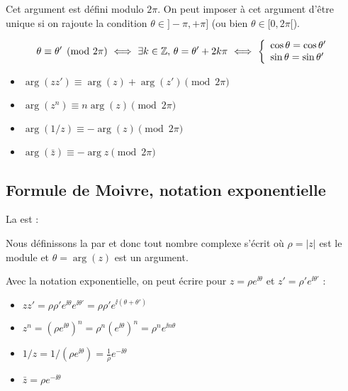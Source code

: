 \documentclass[10pt,class=article,crop=false]{standalone}
\begin{document}
\begin{multicols}{2}

Cet argument est défini modulo $2\pi$. On peut imposer à cet argument d'être unique si on
rajoute la condition $\theta \in {}]-\pi,+\pi]$ (ou bien $\theta \in [0,2\pi[$).

\[ \theta \equiv \theta' \pmod {2\pi}\   \Longleftrightarrow \   \exists k \in
\Zz, \, \theta = \theta' + 2 k \pi \   \Longleftrightarrow \ 
\left\{ \begin{array}{l}
	\cos \theta = \cos \theta'\\
	\sin \theta = \sin \theta'
\end{array} \right. \]

\begin{proposition}
	\sauteligne
	\begin{itemize}
		\item $\arg \left( zz' \right) \equiv \arg (z) + \arg \left(
		z' \right) \pmod {2\pi}$
		
		\item $\arg \left( z^n \right) \equiv n \arg (z) \pmod {2\pi}$
		
		\item $\arg \left( 1 / z \right) \equiv - \arg (z) \pmod {2\pi}$
		
		\item $\arg (\bar{z}) \equiv - \arg z \pmod{2 \pi}$
	\end{itemize}
\end{proposition}


\subsection{Formule de Moivre, notation exponentielle}

La  est :
\mybox{$
	\left( \cos \theta + \ii \sin \theta \right)^n = \cos \left( n \theta \right)
	+ \ii  \sin \left( n \theta \right)$}

Nous définissons la  par
\mybox{$e^{\ii  \theta} = \cos \theta + \ii  \sin \theta$}
et donc tout nombre complexe s'écrit
o\`u $\rho = \left| z \right|$ est le module et $\theta = \arg (z)$ est un argument.

\bigskip

Avec la notation exponentielle, on peut écrire pour $z = \rho e^{\ii  \theta}$ et $z' = \rho' e^{\ii  \theta'}$ :
\begin{itemize}
	\item $zz' = \rho \rho' e^{\ii  \theta} e^{\ii  \theta'} = \rho \rho' e^{\ii  (\theta + \theta')}$
	\item $z^n = \left( \rho e^{\ii  \theta} \right)^n = \rho^n  \left( e^{\ii  \theta}
	\right)^n = \rho^n e^{\ii n \theta}$
	\item $1 / z = 1 / \left( \rho e^{\ii  \theta} \right) = \frac{1}{\rho} e^{- \ii
		\theta}$
	\item $\bar{z} = \rho e^{-\ii \theta}$
\end{itemize}


\end{multicols}
\end{document}
